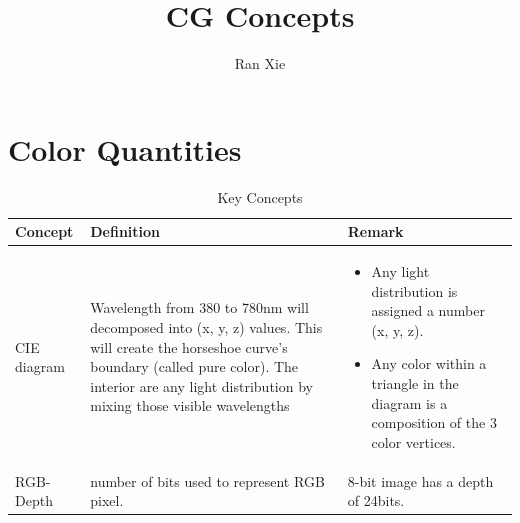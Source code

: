 \documentclass[UTF8]{ctexart}
\title{CG Concepts}
\author{Ran Xie}
\begin{document}
	\maketitle
	\tableofcontents

\section*{Color Quantities}
\begin{table}[h]
	\centering
	\caption{Key Concepts}
	\begin{tabularx}{\textwidth}{| l | X | X |} %
		\hline
		\textbf{Concept} & \textbf{Definition} & \textbf{Remark} \\
		\hline
		CIE diagram 
			& Wavelength from 380 to 780nm will decomposed into (x, y, z) values. This will create the horseshoe curve's boundary (called pure color). The interior are any light distribution by mixing those visible wavelengths 
			& \begin{itemize}
			 	\item Any light distribution is assigned a number (x, y, z). 
			 	\item Any color within a triangle in the diagram is a composition of the 3 color vertices. 
		 	  \end{itemize}   \\
		\hline
		RGB- Depth & number of bits used to represent RGB pixel. & 8-bit image has a depth of 24bits. \\
		\hline
	\end{tabularx} 	
\end{table}

\FloatBarrier %
\end{document}
